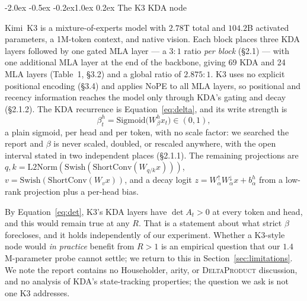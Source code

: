 \documentclass[10pt,twocolumn]{article}
\makeatletter
\renewcommand\section{\@startsection{section}{1}{\z@}%
  {-2.0ex \@plus -0.5ex \@minus -0.2ex}{1.0ex \@plus 0.2ex}%
  {\normalfont\large\bfseries}}
\makeatother
\begin{document}
\section{The K3 KDA node}
\label{sec:k3}

Kimi~K3 \cite{kimi2026k3} is a mixture-of-experts model with $2.78$T total and
$104.2$B activated parameters, a 1M-token context, and native vision. Each block
places three KDA layers followed by one gated MLA layer --- a $3{:}1$ ratio
\emph{per block} (\S2.1) --- with one additional MLA layer at the end of the
backbone, giving 69 KDA and 24 MLA layers (Table~1, \S3.2) and a global ratio of
$2.875{:}1$. K3 uses no explicit positional encoding (\S3.4) and applies NoPE to
all MLA layers, so positional and recency information reaches the model only
through KDA's gating and decay (\S2.1.2). The KDA recurrence is
Equation~\eqref{eq:delta}, and its write strength is
\begin{equation}
\label{eq:k3beta}
\beta_t^{h} = \mathrm{Sigmoid}\bigl(W_\beta^{h} x_t\bigr) \in (0,1),
\end{equation}
a plain sigmoid, per head and per token, with no scale factor: we searched the
report and $\beta$ is never scaled, doubled, or rescaled anywhere, with the open
interval stated in two independent places (\S2.1.1). The remaining projections
are $q,k = \mathrm{L2Norm}(\mathrm{Swish}(\mathrm{ShortConv}(W_{q/k}x)))$,
$v = \mathrm{Swish}(\mathrm{ShortConv}(W_v x))$, and a decay logit
$z = W_\alpha^{\uparrow} W_\alpha^{\downarrow} x + b_\alpha^{h}$ from a low-rank
projection plus a per-head bias.

By Equation~\eqref{eq:det}, K3's KDA layers have $\det A_t > 0$ at every token
and head, and this would remain true at any $R$. That is a statement about what
strict $\beta$ forecloses, and it holds independently of our experiment. Whether
a K3-style node would \emph{in practice} benefit from $R>1$ is an empirical
question that our $1.4$M-parameter probe cannot settle; we return to this in
Section~\ref{sec:limitations}. We note the report contains no Householder,
arity, or \textsc{DeltaProduct} discussion, and no analysis of KDA's
state-tracking properties; the question we ask is not one K3 addresses.
\end{document}
